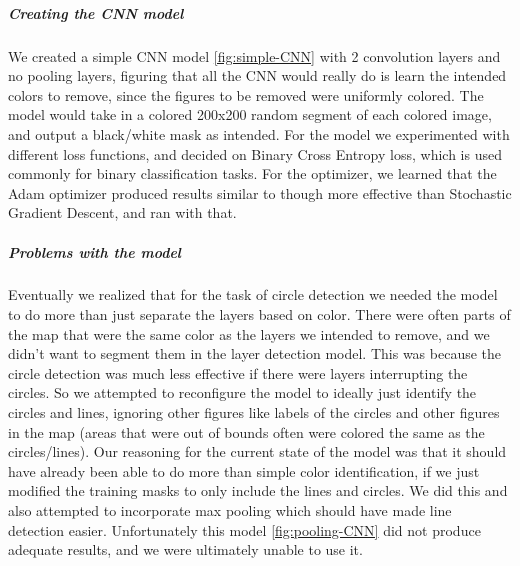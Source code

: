 \documentclass[a4paper,12pt]{extarticle}
\begin{document}
\subparagraph{Creating the CNN model\\}
We created a simple CNN model \ref{fig:simple-CNN} with 2 convolution layers and no pooling layers, figuring that all the CNN would really do is learn the intended colors to remove, since the figures to be removed were uniformly colored. The model would take in a colored 200x200 random segment of each colored image, and output a black/white mask as intended. For the model we experimented with different loss functions, and decided on Binary Cross Entropy loss, which is used commonly for binary classification tasks. For the optimizer, we learned that the Adam optimizer produced results similar to though more effective than Stochastic Gradient Descent, and ran with that.



\subparagraph{Problems with the model\\}
Eventually we realized that for the task of circle detection we needed the model to do more than just separate the layers based on color.
There were often parts of the map that were the same color as the layers we intended to remove, and we didn't want to segment them in the layer detection model.
This was because the circle detection was much less effective if there were layers interrupting the circles. So we attempted to reconfigure the model to ideally just identify the circles and lines, ignoring other figures like labels of the circles and other figures in the map (areas that were out of bounds often were colored the same as the circles/lines).
Our reasoning for the current state of the model was that it should have already been able to do more than simple color identification, if we just modified the training masks to only include the lines and circles. We did this and also attempted to incorporate max pooling which should have made line detection easier. Unfortunately this model \ref{fig:pooling-CNN} did not produce adequate results, and we were ultimately unable to use it.
\end{document}
